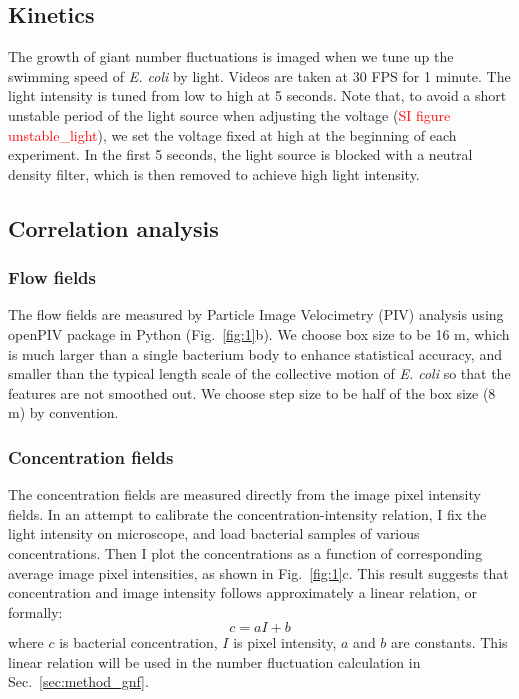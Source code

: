 \documentclass[twocolumn,aps,pre,amsmath,amssymb,floatfix,longbibliography]{revtex4-1}
\begin{document}
\subsection{Kinetics}
The growth of giant number fluctuations is imaged when we tune up the swimming speed of \textit{E. coli} by light. Videos are taken at 30 FPS for 1 minute. The light intensity is tuned from low to high at 5 seconds. Note that, to avoid a short unstable period of the light source when adjusting the voltage (\textcolor{red}{SI figure unstable\_light}), we set the voltage fixed at high at the beginning of each experiment. In the first 5 seconds, the light source is blocked with a neutral density filter, which is then removed to achieve high light intensity.

\subsection{Correlation analysis}

\subsubsection{Flow fields}
The flow fields are measured by Particle Image Velocimetry (PIV) analysis using openPIV package in Python \cite{openpiv} (Fig.~\ref{fig:1}b). We choose box size to be 16 \textmu m, which is much larger than a single bacterium body to enhance statistical accuracy, and smaller than the typical length scale of the collective motion of \textit{E. coli} so that the features are not smoothed out. We choose step size to be half of the box size (8 \textmu m) by convention.

\subsubsection{Concentration fields}
The concentration fields are measured directly from the image pixel intensity fields. In an attempt to calibrate the concentration-intensity relation, I fix the light intensity on microscope, and load bacterial samples of various concentrations. Then I plot the concentrations as a function of corresponding average image pixel intensities, as shown in Fig.~\ref{fig:1}c. This result suggests that concentration and image intensity follows approximately a linear relation, or formally:
$$ c = aI + b $$
where $c$ is bacterial concentration, $I$ is pixel intensity, $a$ and $b$ are constants. This linear relation will be used in the number fluctuation calculation in Sec.~\ref{sec:method_gnf}.
\end{document}
